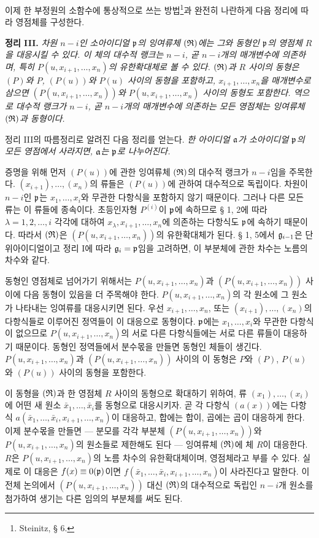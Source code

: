 이제 한 부정원의 소함수에 통상적으로 쓰는 방법\footnote{Steinitz, § 6.}과 완전히 나란하게 다음 정리에 따라 영점체를 구성한다.

\textbf{정리 III.} \emph{차원 \(n-i\)인 소아이디얼 \(\mathfrak p\)의 잉여류체 \((\mathfrak{R})\)에는 그와 동형인 \(\mathfrak p\)의 영점체 \(R\)을 대응시킬 수 있다. 이 체의 대수적 랭크는 \(n-i\), 곧 \(n-i\)개의 매개변수에 의존하며, 특히 \(P(u,x_{i+1},\ldots,x_n)\)의 유한확대체로 볼 수 있다. \((\mathfrak{R})\)과 \(R\) 사이의 동형은 \((P)\)와 \(P\), \((P(u))\)와 \(P(u)\) 사이의 동형을 포함하고, \(x_{i+1},\ldots,x_n\)을 매개변수로 삼으면 \((P(u,x_{i+1},\ldots,x_n))\)와 \(P(u,x_{i+1},\ldots,x_n)\) 사이의 동형도 포함한다. 역으로 대수적 랭크가 \(n-i\), 곧 \(n-i\)개의 매개변수에 의존하는 모든 영점체는 잉여류체 \((\mathfrak{R})\)과 동형이다.}

정리 III의 따름정리로 알려진 다음 정리를 얻는다. \emph{한 아이디얼 \(\mathfrak a\)가 소아이디얼 \(\mathfrak p\)의 모든 영점에서 사라지면, \(\mathfrak a\)는 \(\mathfrak p\)로 나누어진다.}

증명을 위해 먼저 \((P(u))\)에 관한 잉여류체 \((\mathfrak{R})\)의 대수적 랭크가 \(n-i\)임을 주목한다. \((x_{i+1}),\ldots,(x_n)\)의 류들은 \((P(u))\)에 관하여 대수적으로 독립이다. 차원이 \(n-i\)인 \(\mathfrak p\)는 \(x_1,\ldots,x_i\)와 무관한 다항식을 포함하지 않기 때문이다. 그러나 다른 모든 류는 이 류들에 종속이다. 초등인자형 \(P^{(i)}\)이 \(\mathfrak p\)에 속하므로 § 1, 2에 따라 \(\lambda=1,2,\ldots,i\) 각각에 대하여 \(x_\lambda,x_{i+1},\ldots,x_n\)에 의존하는 다항식도 \(\mathfrak p\)에 속하기 때문이다. 따라서 \((\mathfrak{R})\)은 \((P(u,x_{i+1},\ldots,x_n))\)의 유한확대체가 된다. § 1, 5에서 \(\mathfrak g_{i-1}\)은 단위아이디얼이고 정리 I에 따라 \(\mathfrak g_i=\mathfrak p\)임을 고려하면, 이 부분체에 관한 차수는 노름의 차수와 같다.

동형인 영점체로 넘어가기 위해서는 \(P(u,x_{i+1},\ldots,x_n)\)과 \((P(u,x_{i+1},\ldots,x_n))\) 사이에 다음 동형이 있음을 더 주목해야 한다. \(P(u,x_{i+1},\ldots,x_n)\)의 각 원소에 그 원소가 나타내는 잉여류를 대응시키면 된다. 우선 \(x_{i+1},\ldots,x_n\), 또는 \((x_{i+1}),\ldots,(x_n)\)의 다항식들로 이루어진 정역들이 이 대응으로 동형이다. \(\mathfrak p\)에는 \(x_1,\ldots,x_i\)와 무관한 다항식이 없으므로 \(P(u,x_{i+1},\ldots,x_n)\)의 서로 다른 다항식들에는 서로 다른 류들이 대응하기 때문이다. 동형인 정역들에서 분수몫을 만들면 동형인 체들이 생긴다. \(P(u,x_{i+1},\ldots,x_n)\)과 \((P(u,x_{i+1},\ldots,x_n))\) 사이의 이 동형은 \(P\)와 \((P)\), \(P(u)\)와 \((P(u))\) 사이의 동형을 포함한다.

이 동형을 \((\mathfrak{R})\)과 한 영점체 \(R\) 사이의 동형으로 확대하기 위하여, 류 \((x_1),\ldots,(x_i)\)에 어떤 새 원소 \(\bar{x}_1,\ldots,\bar{x}_i\)를 동형으로 대응시키자. 곧 각 다항식 \((a(x))\)에는 다항식 \(a(\bar{x}_1,\ldots,\bar{x}_i,x_{i+1},\ldots,x_n)\)이 대응하고, 합에는 합이, 곱에는 곱이 대응하게 한다. 이제 분수몫을 만들면 --- 분모를 각각 부분체 \((P(u,x_{i+1},\ldots,x_n))\)와 \(P(u,x_{i+1},\ldots,x_n)\)의 원소들로 제한해도 된다 --- 잉여류체 \((\mathfrak{R})\)에 체 \(R\)이 대응한다. \(R\)은 \(P(u,x_{i+1},\ldots,x_n)\)의 노름 차수의 유한확대체이며, 영점체라고 부를 수 있다. 실제로 이 대응은 \(f(x)\equiv0(\mathfrak p)\)이면 \(f(\bar{x}_1,\ldots,\bar{x}_i,x_{i+1},\ldots,x_n)\)이 사라진다고 말한다. 이 전체 논의에서 \((P(u,x_{i+1},\ldots,x_n))\) 대신 \((\mathfrak{R})\)의 대수적으로 독립인 \(n-i\)개 원소를 첨가하여 생기는 다른 임의의 부분체를 써도 된다.

